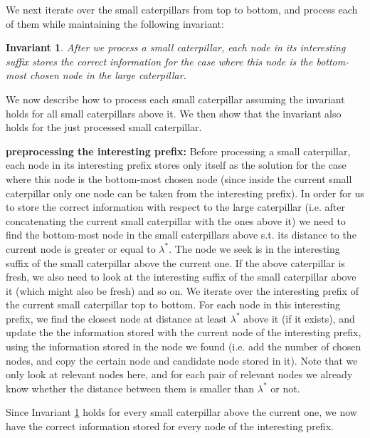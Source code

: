 \documentclass[11pt,a4paper]{article}
\newcounter{mycounter}
\newenvironment{noindlist}
 {\begin{list}{\arabic{mycounter}.~~}{\usecounter{mycounter} \labelsep=0em \labelwidth=0em \leftmargin=0em \itemindent=0em}}
 {\end{list}}
\newtheorem{invariant}{Invariant}
\theoremstyle{definition}
\theoremstyle{remark}
\begin{document}
We next iterate over the small caterpillars from top to bottom, and process each of them while maintaining the following invariant:
\begin{invariant} \label{invariant small caterpillar is correct after prep.} After we process a small caterpillar, each node in its interesting suffix stores the correct information for the case where this node is the bottom-most chosen node in the large caterpillar. 
\end{invariant}

We now describe how to process each small caterpillar assuming the invariant holds for all small caterpillars above it. We then show that the invariant also holds for the just processed small caterpillar. 

\begin{noindlist}
\item \textbf{preprocessing the interesting prefix:}
Before processing a small caterpillar, each node in its interesting prefix stores only itself as the solution for the case where this node is the bottom-most chosen node (since inside the current small caterpillar only one node can be taken from the interesting prefix). In order for us to store the correct information with respect to the large caterpillar (i.e. after concatenating the current small caterpillar with the ones above it) we need to find the bottom-most node in the small caterpillars above s.t. its distance to the current node is greater or equal to $\lambda^*$.
The node we seek is in the interesting suffix of the small caterpillar above the current one. If the above caterpillar is fresh, we also need to look at the interesting suffix of the small caterpillar above it (which might also be fresh) and so on. 
We iterate over the interesting prefix of the current small caterpillar top to bottom. 
For each node in this interesting prefix, we find the closest node at distance at least $\lambda^*$ above it (if it exists), and update the the information stored with the current node of the interesting prefix, using the information stored in the node we found (i.e. add the number of chosen nodes, and copy the certain node and candidate node stored in it). Note that we only look at relevant nodes here, and for each pair of relevant nodes we already know whether the distance between them is smaller than $\lambda^*$ or not.

Since Invariant \ref{invariant small caterpillar is correct after prep.} holds for every small caterpillar above the current one, we now have the correct information stored for every node of the interesting prefix.




\end{noindlist}
\end{document}
